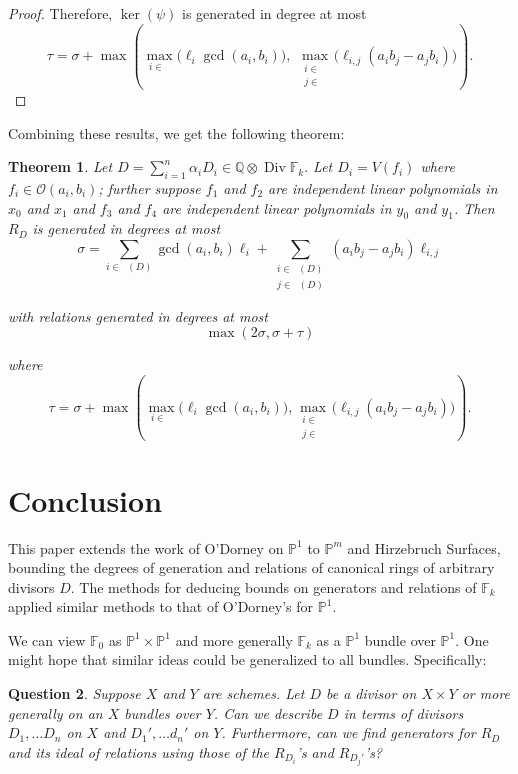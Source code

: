 \documentclass{amsart}
\theoremstyle{plain}
\newtheorem{thm}{Theorem}[section]
\newtheorem{question}[thm]{Question}
\theoremstyle{definition}
\theoremstyle{remark}
\numberwithin{equation}{section}
\newcommand\bq{{\mathbb Q}}
\newcommand\bp{{\mathbb P}}
\newcommand\sco{{\mathscr O}}
\DeclareMathOperator\di{Div}
\newcommand\bida{a}
\newcommand\bidb{b}
\newcommand\hirz{\mathbb{F}}
\DeclareMathOperator{\Te}{T_=}
\DeclareMathOperator{\Tp}{T_+}
\DeclareMathOperator{\Tm}{T_-}
\begin{document}
\begin{proof}
\noindent
Therefore, $\ker(\psi)$ is generated in degree at most
\[
	\tau = \sigma
	+ \max \left(\max_{i\in \Te} \bigl(\ell_i \gcd(a_i, b_i) \bigr),
	\; \max_{\substack{i \in \Tp \\ j \in \Tm}} \bigl(\ell_{i, j}
	(\bida_i \bidb_j - \bida_j
	\bidb_i) \bigr) \right).
\]
\end{proof}

Combining these results, we get the following theorem:

\begin{thm}
\label{thm:hirz-generators-relations}
Let $D = \sum_{i=1}^n \alpha_i D_i \in \bq \otimes \di \hirz_k.$ Let $D_i =
V(f_i)$ where $f_i \in \sco(a_i, b_i)$; further suppose $f_1$ and $f_2$ are
independent linear
polynomials in $x_0$ and $x_1$ and $f_3$ and $f_4$ are independent
linear polynomials in $y_0$ and $y_1$.
Then $R_D$ is generated in degrees at most
\[
	\sigma = \sum_{i\in \Te(D)} \gcd(\bida_i, \bidb_i)\ell_i +
	\sum_{\substack{i \in \Tp(D) \\	j \in \Tm(D)}} (\bida_i \bidb_j
	- \bida_j \bidb_i) \ell_{i, j}
\]

\noindent
with relations generated in degrees at most 
\[
	\max(2 \sigma, \sigma + \tau)
\]

\noindent
where
\[
	\tau = \sigma
	+ \max \left( \max_{i\in \Te} \bigl(\ell_i \gcd(a_i, b_i) \bigr),
	\max_{\substack{i \in \Tp \\ j \in \Tm}} \bigl(\ell_{i, j}
	(\bida_i \bidb_j - \bida_j \bidb_i) \bigr) \right).
\]
\end{thm}




\section{Conclusion}
\label{sec:conc}
This paper extends the work of O'Dorney \cite{dorney:canonical} on $\bp^1$ to
$\bp^m$ and Hirzebruch Surfaces, bounding the degrees of generation and
relations of canonical rings of arbitrary divisors $D$.  The methods for
deducing bounds on generators and relations of $\hirz_k$ applied similar
methods to that of O'Dorney's for $\bp^1$.  

We can view $\hirz_0$ as $\bp^1\times \bp^1$ and more generally $\hirz_k$ as a
$\bp^1$ bundle over $\bp^1$.  One might hope that similar ideas could be
generalized to all bundles.  Specifically:
\begin{question}
\label{qn:general-product-bundle}
Suppose $X$ and $Y$ are schemes.  Let $D$ be a divisor on $X\times Y$ or more
generally on an $X$ bundles over $Y$.  Can we describe $D$ in terms of divisors
$D_1, \ldots D_n$ on $X$ and $D_1', \ldots d_n'$ on $Y$.  Furthermore, can we
find generators for $R_D$ and its ideal of relations using those of the
$R_{D_i}$'s and $R_{D_j'}$'s?
\end{question}
\end{document}

